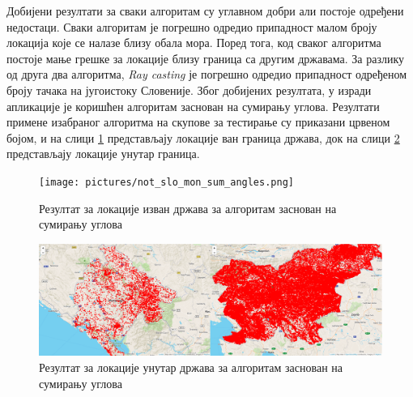 \documentclass[12pt,oneside]{memoir}
\begin{document}

Добијени резултати за сваки алгоритам су углавном добри али постоје одређени недостаци. Сваки алгоритам је погрешно одредио припадност малом броју локација које се налазе близу обала мора. Поред тога, код сваког алгоритма постоје мање грешке за локације близу граница са другим државама. За разлику од друга два алгоритма, \textit{Ray casting} је погрешно одредио припадност одређеном броју тачака на југоистоку Словеније. Због добијених резултата, у изради апликације је коришћен алгоритам заснован на сумирању углова. Резултати примене изабраног алгоритма на скупове за тестирање су приказани црвеном бојом, и на слици \ref{fig:not_slo_mon_example} представљају локације ван граница држава, док на слици \ref{fig:slo_mon_example} представљају локације унутар граница.

\begin{figure}[!ht]
  \centering
  \texttt{[image: pictures/not\_slo\_mon\_sum\_angles.png]}
  \caption{Резултат за локације изван држава за алгоритам заснован на сумирању углова}
  \label{fig:not_slo_mon_example}
\end{figure}

\begin{figure}[!ht]
  \centering
  \includegraphics[width=1\textwidth]{pictures/slo_mon_sum_angles.png}
  \caption{Резултат за локације унутар држава за алгоритам заснован на сумирању углова}
  \label{fig:slo_mon_example}
\end{figure}
\end{document}
